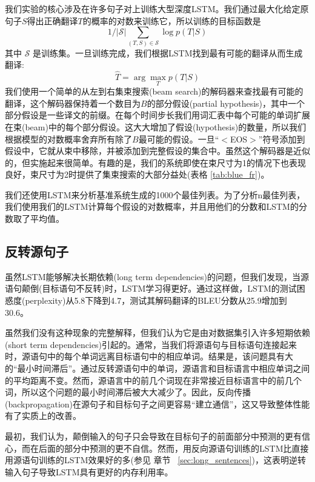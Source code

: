 我们实验的核心涉及在许多句子对上训练大型深度LSTM。我们通过最大化给定原句子$S$得出正确翻译$T$的概率的对数来训练它，所以训练的目标函数是
$$1/|\mathcal S|\sum_{(T,S)\in\mathcal S}\log p(T|S)$$ 其中 $\mathcal
S$ 是训练集。一旦训练完成，我们根据LSTM找到最有可能的翻译从而生成翻译:
\begin{equation}
\label{eqn:decode}
\hat{T} = \arg\max_T p(T|S)
\end{equation}
我们使用一个简单的从左到右集束搜索(beam search)的解码器来查找最有可能的翻译，这个解码器保持着一个数目为$B$的部分假设(partial hypothesis)，其中一个部分假设是一些译文的前缀。在每个时间步长我们用词汇表中每个可能的单词扩展在束(beam)中的每个部分假设。这大大增加了假设(hypothesis)的数量，所以我们根据模型的对数概率舍弃所有除了$B$最可能的假设。一旦``$<$EOS$>$''符号添加到假设中，它就从束中移除，并被添加到完整假设的集合中。虽然这个解码器是近似的，但实施起来很简单。有趣的是，我们的系统即使在束尺寸为1的情况下也表现良好，束尺寸为2时提供了集束搜索的大部分益处(表格
\ref{tab:blue_fr})。


我们还使用LSTM来分析基准系统生成的1000个最佳列表\cite{wmt14_en_fr}。为了分析n最佳列表，我们使用我们的LSTM计算每个假设的对数概率，并且用他们的分数和LSTM的分数取了平均值。

\subsection{反转源句子}
\label{sec:rev_rev}

虽然LSTM能够解决长期依赖(long term dependencies)的问题，但我们发现，当源语句颠倒(目标语句不反转)时，LSTM学习得更好。通过这样做，LSTM的测试困惑度(perplexity)从5.8下降到4.7，测试其解码翻译的BLEU分数从25.9增加到30.6。



虽然我们没有这种现象的完整解释，但我们认为它是由对数据集引入许多短期依赖(short term dependencies)引起的。通常，当我们将源语句与目标语句连接起来时，源语句中的每个单词远离目标语句中的相应单词。结果是，该问题具有大的``最小时间滞后''\cite{minimal_time_lag}。通过反转源语句中的单词，源语言和目标语言中相应单词之间的平均距离不变。然而，源语言中的前几个词现在非常接近目标语言中的前几个词，所以这个问题的最小时间滞后被大大减少了。因此，反向传播(backpropagation)在源句子和目标句子之间更容易“建立通信”，这又导致整体性能有了实质上的改善。

最初，我们认为，颠倒输入的句子只会导致在目标句子的前面部分中预测的更有信心，而在后面的部分中预测的更不自信。然而，用反向源语句训练的LSTM比直接用源语句训练的LSTM效果好的多(参见
章节 ~\ref{sec:long_sentences})，这表明逆转输入句子导致LSTM具有更好的内存利用率。



